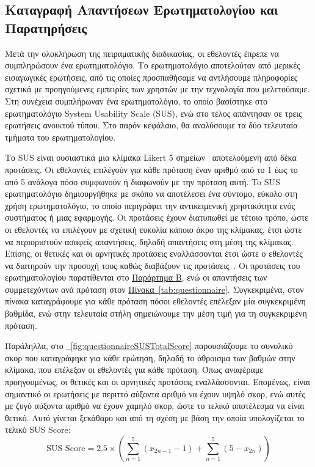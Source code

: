\subsection{Καταγραφή Απαντήσεων Ερωτηματολογίου και Παρατηρήσεις}

Μετά την ολοκλήρωση της πειραματικής διαδικασίας, οι εθελοντές έπρεπε να συμπληρώσουν ένα ερωτηματολόγιο. Το ερωτηματολόγιο αποτελούταν από μερικές εισαγωγικές ερωτήσεις, από τις οποίες προσπαθήσαμε να αντλήσουμε πληροφορίες σχετικά με προηγούμενες εμπειρίες των χρηστών με την τεχνολογία που μελετούσαμε. Στη συνέχεια συμπλήρωναν ένα ερωτηματολόγιο, το οποίο βασίστηκε στο ερωτηματολόγιο System Usability Scale (SUS), ενώ στο τέλος απάντησαν σε τρεις ερωτήσεις ανοικτού τύπου. Στο παρόν κεφάλαιο, θα αναλύσουμε τα δύο τελευταία τμήματα του ερωτηματολογίου.

Το SUS είναι ουσιαστικά μια κλίμακα Likert 5 σημείων~\cite{likert_1932_a} αποτελούμενη από δέκα προτάσεις. Οι εθελοντές επιλέγούν για κάθε πρόταση έναν αριθμό από το 1 έως το από 5 ανάλογα πόσο συμφωνούν ή διαφωνούν με την πρόταση αυτή. To SUS ερωτηματολόγιο δημιουργήθηκε με σκόπο να αποτέλεσει ένα σύντομο, εύκολο στη χρήση ερωτηματολόγιο, το οποίο περιγράφει την αντικειμενική χρηστικότητα ενός συστήματος ή μιας εφαρμογής. Οι προτάσεις έχουν διατυπωθεί με τέτοιο τρόπο, ώστε οι εθελοντές να επιλέγουν με σχετική ευκολία κάποιο άκρο της κλίμακας, έτσι ώστε να περιοριστούν ασαφείς απαντήσεις, δηλαδή απαντήσεις στη μέση της κλίμακας. Επίσης, οι θετικές και οι αρνητικές προτάσεις εναλλάσσονται έτσι ώστε ο εθελοντές να διατηρούν την προσοχή τους καθώς διαβάζουν τις προτάσεις~\cite{brooke_1995_sus}. Οι προτάσεις του ερωτηματολογίου παρατίθενται στο \hyperref[ch:appendixB]{Παράρτημα Β}, ενώ οι απαντήσεις των συμμετεχόντων ανά πρόταση στον \hyperref[tab:questionnaire]{Πίνακα~\ref*{tab:questionnaire}}. Συγκεκριμένα, στον πίνακα καταγράφουμε για κάθε πρόταση πόσοι εθελοντές επέλεξαν μία συγκεκριμένη βαθμίδα, ενώ στην τελευταία στήλη σημειώνουμε την μέση τιμή για τη συγκεκριμένη πρόταση.



Παράληλλα, στο \hyperref[fig:questionnaireSUSTotalScore]{\schema~\ref*{fig:questionnaireSUSTotalScore}} παρουσιάζουμε το συνολικό σκορ που καταγράφηκε για κάθε ερώτηση, δηλαδή το άθροισμα των βαθμών στην κλίμακα, που επέλεξαν οι εθελοντές για κάθε πρόταση. Όπως αναφέραμε προηγουμένως, οι θετικές και οι αρνητικές προτάσεις εναλλάσσονται. Επομένως, είναι σημαντικό οι ερωτήσεις με περιττό αύξοντα αριθμό να έχουν υψηλό σκορ, ενώ αυτές με ζυγό αύξοντα αριθμό να έχουν χαμηλό σκορ, ώστε το τελικό αποτέλεσμα να είναι θετικό. Αυτό γίνεται ξεκάθαρο και από τη σχέση με βάση την οποία υπολογίζεται το τελικό SUS Score:
\[
  \text{SUS Score} = 2.5 \times ( \sum_{n=1}^{5}(x_{2n - 1} - 1) + \sum_{n=1}^{5}(5 - x_{2n}))
\]

